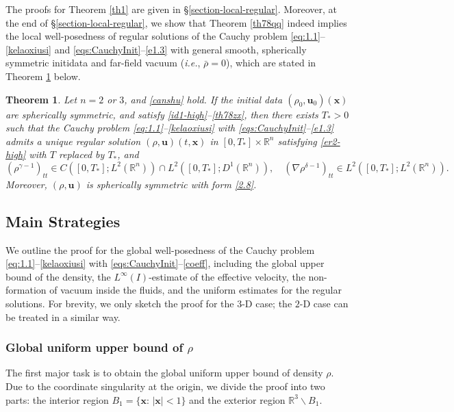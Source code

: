 \documentclass[11pt,reqno]{amsart}
\newtheorem{thm}{Theorem}[section]
\numberwithin{rk}{section}
\numberwithin{prop}{section}
\numberwithin{mydef}{section}
\numberwithin{lem}{section}
\numberwithin{equation}{section}
\numberwithin{thm}{section}
\begin{document}
The proofs for Theorem \ref{th1} are given in \S \ref{section-local-regular}. Moreover, at the end of \S \ref{section-local-regular}, we show that Theorem \ref{th78qq} indeed implies the local well-posedness of regular solutions of the Cauchy problem \eqref{eq:1.1}--\eqref{kelaoxiusi} and \eqref{eqs:CauchyInit}--\eqref{e1.3}  with general smooth, spherically symmetric initidata and far-field vacuum (\textit{i.e.}, $\bar{\rho}=0$), which are stated in Theorem \ref{thm-loc} below.
\begin{thm}\label{thm-loc}
Let $n=2$ or $3$, and \eqref{canshu} hold. If the initial data $(\rho_0, \boldsymbol{u}_0)(\boldsymbol{x})$ are spherically symmetric, and satisfy \eqref{id1-high}--\eqref{th78zx}, then there exists $T_*>0$ such that the Cauchy problem \eqref{eq:1.1}{\rm--}\eqref{kelaoxiusi} with \eqref{eqs:CauchyInit}{\rm--}\eqref{e1.3}  admits a unique regular solution $(\rho, \boldsymbol{u})(t, \boldsymbol{x})$ in $[0, T_*] \times \mathbb{R}^n$ satisfying \eqref{er2-high} with $T$ replaced by $T_*$, and
\begin{equation*}
(\rho^{\gamma-1})_{t t} \in C([0, T_*] ; L^2(\mathbb{R}^n)) \cap L^2([0,T_*];D^1(\mathbb{R}^n)), \quad(\nabla \rho^{\delta-1})_{tt} \in L^2([0, T_*];L^2(\mathbb{R}^n)) .    
\end{equation*}
Moreover, $(\rho, \boldsymbol{u})$ is spherically symmetric with form \eqref{2.8}.    
\end{thm}
  
\subsection{Main Strategies}\label{subsection-strategy}
We outline the proof for the global well-posedness of the Cauchy problem \eqref{eq:1.1}--\eqref{kelaoxiusi} with 
\eqref{eqs:CauchyInit}--\eqref{coeff},  including the global upper bound of the density, the $L^\infty(I)$-estimate of the effective velocity, the non-formation of vacuum inside the fluids, and the uniform estimates for the regular solutions. For brevity, we only sketch the proof for the $3$-D case; the $2$-D case can be treated in a similar way.

\subsubsection{Global uniform upper bound of $\rho$}
The first major task is to obtain the global uniform upper bound of density $\rho$. Due to the coordinate singularity at the origin, we divide the proof into two parts: the interior region $B_1=\{\boldsymbol{x}:\,|\boldsymbol{x}|<1\}$ and the exterior region $\mathbb{R}^3\backslash B_1$. 
\end{document}
